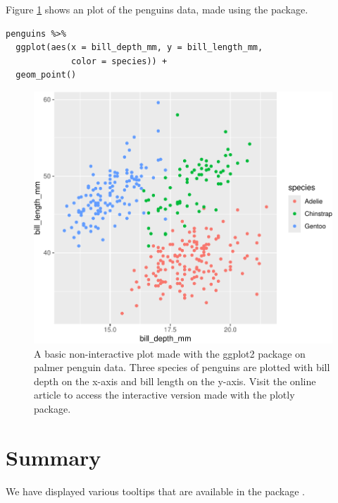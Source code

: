 Figure
\ref{fig:penguins-ggplot}
shows an plot of
the penguins data, made using the
package.

\begin{verbatim}
penguins %>% 
  ggplot(aes(x = bill_depth_mm, y = bill_length_mm, 
             color = species)) + 
  geom_point()
\end{verbatim}

\begin{figure}
\includegraphics[width=1\linewidth]{jointCalib_files/figure-latex/penguins-ggplot-1} \caption{A basic non-interactive plot made with the ggplot2 package on palmer penguin data. Three species of penguins are plotted with bill depth on the x-axis and bill length on the y-axis. Visit the online article to access the interactive version made with the plotly package.}\label{fig:penguins-ggplot}
\end{figure}

\section{Summary}\label{summary}

We have displayed various tooltips that are available in the package
.



\address{%
Maciej Beręsewicz\\
Poznań University of Economics and Business Statistical Office in Poznań\\%
Department of Statistics, Al. Niepodległości 10, 61-875 Poznań, Poland\\ Centre for the Methodology of Population Studies, Wojska Polskiego 27/29, 60-624 Poznań Poland\\
%
\url{https://www.britannica.com/animal/quokka}\\%
\textit{ORCiD: \href{https://orcid.org/0000-0002-8281-4301}{0000-0002-8281-4301}}\\%
\href{mailto:maciej.beresewicz@ue.poznan.pl}{\nolinkurl{maciej.beresewicz@ue.poznan.pl}}%
}

